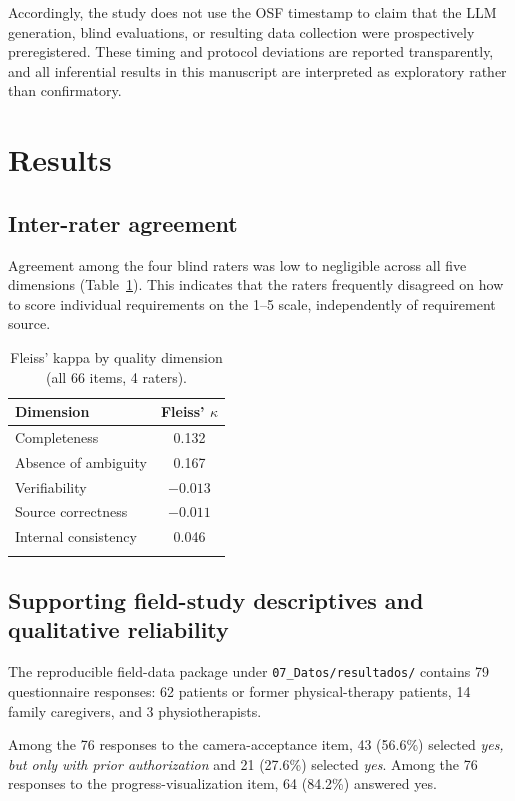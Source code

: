 \documentclass[pdflatex,sn-basic]{sn-jnl}
\begin{document}
Accordingly, the study does not use the OSF timestamp to claim that the LLM generation, blind evaluations, or resulting data collection were prospectively preregistered. These timing and protocol deviations are reported transparently, and all inferential results in this manuscript are interpreted as exploratory rather than confirmatory.

\section{Results}
\label{sec:results}

\subsection{Inter-rater agreement}

Agreement among the four blind raters was low to negligible across all five dimensions (Table~\ref{tab:kappa}). This indicates that the raters frequently disagreed on how to score individual requirements on the 1--5 scale, independently of requirement source.

\begin{table}[h]
\centering
\caption{Fleiss' kappa by quality dimension (all 66 items, 4 raters).}
\label{tab:kappa}
\begin{tabular}{lc}
\toprule
Dimension & Fleiss' $\kappa$ \\
\midrule
Completeness & 0.132 \\
Absence of ambiguity & 0.167 \\
Verifiability & $-0.013$ \\
Source correctness & $-0.011$ \\
Internal consistency & 0.046 \\
\botrule
\end{tabular}
\end{table}

\subsection{Supporting field-study descriptives and qualitative reliability}

The reproducible field-data package under \texttt{07\_Datos/resultados/} contains 79 questionnaire responses: 62 patients or former physical-therapy patients, 14 family caregivers, and 3 physiotherapists.

Among the 76 responses to the camera-acceptance item, 43 (56.6\%) selected \textit{yes, but only with prior authorization} and 21 (27.6\%) selected \textit{yes}. Among the 76 responses to the progress-visualization item, 64 (84.2\%) answered yes.
\end{document}
